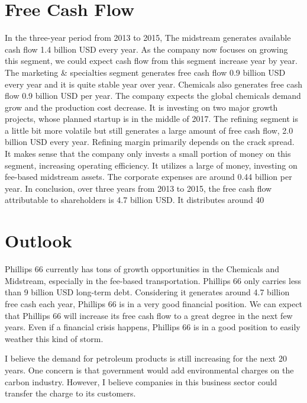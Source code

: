 \documentclass[11pt]{article}
\begin{document}
\section{Free Cash Flow}
In the three-year period from 2013 to 2015, The midstream generates available cash flow 1.4 billion USD every year. As the company now focuses on growing this segment, we could expect cash flow from this segment increase year by year. The marketing \& specialties segment generates free cash flow 0.9 billion USD every year and it is quite stable year over year. Chemicals also generates free cash flow 0.9 billion USD per year. The company expects the global chemicals demand grow and the production cost decrease. It is investing on two major growth projects, whose planned startup is in the middle of 2017. The refining segment is a little bit more volatile but still generates a large amount of free cash flow, 2.0 billion USD every year. Refining margin primarily depends on the crack spread. It makes sense that the company only invests a small portion of money on this segment, increasing operating efficiency. It utilizes a large of money, investing on fee-based midstream assets. The corporate expenses are around 0.44 billion per year. In conclusion, over three years from 2013 to 2015, the free cash flow attributable to shareholders is 4.7 billion USD. It distributes around 40%

\section{Outlook}
Phillips 66 currently has tons of growth opportunities in the Chemicals and Midstream, especially in the fee-based transportation. Phillips 66 only carries less than 9 billion USD long-term debt. Considering it generates around 4.7 billion free cash each year, Phillips 66 is in a very good financial position. We can expect that Phillips 66 will increase its free cash flow to a great degree in the next few years. Even if a financial crisis happens, Phillips 66 is in a good position to easily weather this kind of storm.

I believe the demand for petroleum products is still increasing for the next 20 years. One concern is that government would add environmental charges on the carbon industry. However, I believe companies in this business sector could transfer the charge to its customers.     
\end{document}
